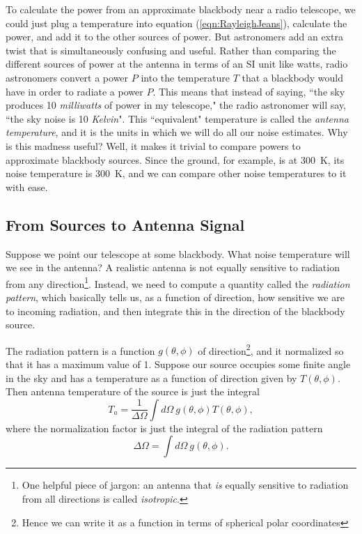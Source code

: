\documentclass[11pt]{amsart}
\begin{document}
To calculate the power from an approximate blackbody near a radio telescope, we could just plug a temperature into equation (\ref{eqn:RayleighJeans}), calculate the power, and add it to the other sources of power. But astronomers add an extra twist that is simultaneously confusing and useful. Rather than comparing the different sources of power at the antenna in terms of an SI unit like watts, radio astronomers convert a power $P$ into the temperature $T$ that a blackbody would have in order to radiate a power $P$. This means that instead of saying, ``the sky produces 10 \emph{milliwatts} of power in my telescope," the radio astronomer will say, ``the sky noise is 10 \emph{Kelvin}". This ``equivalent" temperature is called the \emph{antenna temperature}, and it is the units in which we will do all our noise estimates. Why is this madness useful? Well, it makes it trivial to compare powers to approximate blackbody sources. Since the ground, for example, is at 300~K, its noise temperature is 300~K, and we can compare other noise temperatures to it with ease.

\subsection{From Sources to Antenna Signal}
Suppose we point our telescope at some blackbody. What noise temperature will we see in the antenna? A realistic antenna is not equally sensitive to radiation from any direction\footnote{One helpful piece of jargon: an antenna that \emph{is} equally sensitive to radiation from all directions is called \emph{isotropic}.}. Instead, we need to compute a quantity called the \emph{radiation pattern}, which basically tells us, as a function of direction, how sensitive we are to incoming radiation, and then integrate this in the direction of the blackbody source.

The radiation pattern is a function $g(\theta, \phi)$ of direction\footnote{Hence we can write it as a function in terms of spherical polar coordinates}, and it normalized so that it has a maximum value of 1. Suppose our source occupies some finite angle in the sky and has a temperature as a function of direction given by $T(\theta, \phi)$. Then antenna temperature of the source is just the integral
\begin{equation}\label{eqn:antennanoise}
T_a = \frac{1}{\Delta \Omega} \int d\Omega~g(\theta, \phi) T(\theta, \phi),
\end{equation}
where the normalization factor is just the integral of the radiation pattern
\begin{equation}
\Delta \Omega = \int d\Omega~g(\theta, \phi).
\end{equation}
\end{document}
